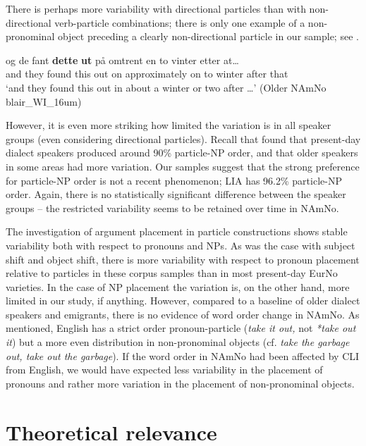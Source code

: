 \documentclass[output=paper]{langscibook}
\begin{document}
There is perhaps more variability with directional particles than with non-directional verb-particle combinations; there is only one example of a non-pronominal object preceding a clearly non-directional particle in our sample; see .

\ea%
    \label{ex:larsson:34}
  
    \gll og de fant \textbf{dette} \textbf{ut} på omtrent en to vinter etter at…\\
          and they found this out on approximately on to winter after that \\
    \glt ‘and they found this out in about a winter or two after …’   (Older NAmNo blair\_WI\_16um)\\
\z %
        

However, it is even more striking how limited the variation is in all speaker groups (even considering directional particles). Recall that \citet{LarssonLundquist2014} found that present-day dialect speakers produced around 90\% particle-NP order, and that older speakers in some areas had more variation. Our samples suggest that the strong preference for particle-NP order is not a recent phenomenon; LIA has 96.2\% particle-NP order. Again, there is no statistically significant difference between the speaker groups – the restricted variability seems to be retained over time in NAmNo. 

The investigation of argument placement in particle constructions shows stable variability both with respect to pronouns and NPs. As was the case with subject shift and object shift, there is more variability with respect to pronoun placement relative to particles in these corpus samples than in most present-day EurNo varieties. In the case of NP placement the variation is, on the other hand, more limited in our study, if anything. However, compared to a baseline of older dialect speakers and emigrants, there is no evidence of word order change in NAmNo. As mentioned, English has a strict order pronoun-particle (\textit{take it out,} not \textit{*take out it}) but a more even distribution in non-pronominal objects (cf. \textit{take the garbage out, take out the garbage}). If the word order in NAmNo had been affected by CLI from English, we would have expected less variability in the placement of pronouns and rather more variation in the placement of non-pronominal objects.

\section{Theoretical relevance}\label{sec:larsson:6}
\end{document}
